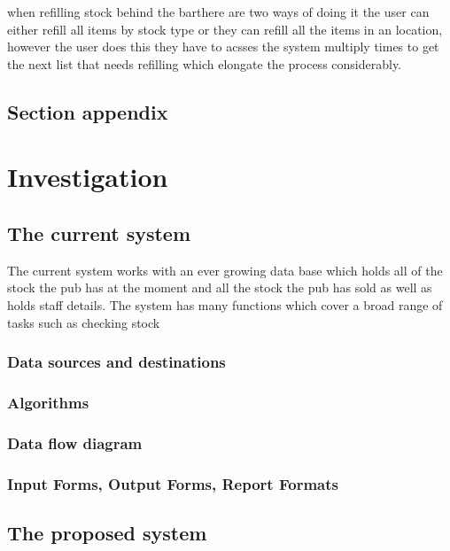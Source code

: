 when refilling stock behind the barthere are two ways of doing it the user can either refill all items by stock type or they can refill all the items in an location, however the user does this they have to acsses the system multiply times to get the next list that needs refilling which elongate the process considerably.



\subsection{Section appendix}


\section{Investigation}

\subsection{The current system}

The current system works with an ever growing data base which holds all of the stock the pub has at the moment and all the stock the pub has sold as well as holds staff details. The system has many functions which cover a broad range of tasks such as checking stock

\subsubsection{Data sources and destinations}


\subsubsection{Algorithms}

\subsubsection{Data flow diagram}

\subsubsection{Input Forms, Output Forms, Report Formats}

\subsection{The proposed system}

